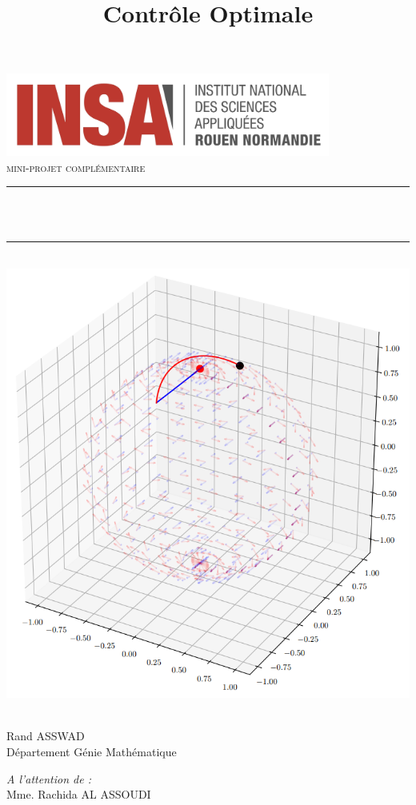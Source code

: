 \documentclass[
  french,
]{article}
\title{Contrôle Optimale}
\author{}
\date{\vspace{-2.5em}}
\newcommand{\HRule}{\rule{\linewidth}{0.5mm}}
\begin{document}
\maketitle

\begin{titlepage}
    \begin{sffamily}
        \begin{center}
            \includegraphics[width=0.8\textwidth]{img/logo}\\[2cm]

            \textsc{\huge mini-projet complémentaire}\\[1cm]

            \HRule \\[0.4cm]
            {\huge \bfseries \@title \\[0.4cm]}
            \HRule \\[1.5cm]

            \includegraphics[width=.5\textwidth]{img/cover_img}~\\[2cm]

            \begin{minipage}{0.4\textwidth}
            \begin{flushleft} \large
                Rand ASSWAD\\
                Département Génie Mathématique
            \end{flushleft}
            \end{minipage}
            \begin{minipage}{0.4\textwidth}
            \begin{flushright} \large
                \emph{A l'attention de :}\\
                Mme. Rachida AL ASSOUDI
            \end{flushright}
            \end{minipage}

            \vfill
            {\large \@date}
        \end{center}
    \end{sffamily}
\end{titlepage}
\makeatother
\end{document}

